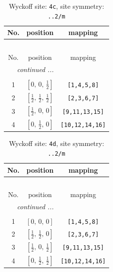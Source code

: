 \documentclass[fleqn,8pt]{jsarticle}
\begin{document}
\renewcommand{\arraystretch}{1.2}
\begin{longtable}{ccc}
\caption{Wyckoff site: {\tt 4c}, site symmetry: {\tt ..2/m}}
 \\
 \hline \hline
No. & position & mapping \\ \hline \endfirsthead

\multicolumn{2}{l}{\tablename\ \thetable{}} \\
 \hline \hline
No. & position & mapping \\ \hline \endhead

 \hline \hline
\multicolumn{2}{r}{\footnotesize\it continued ...} \\ \endfoot

 \hline \hline
\multicolumn{2}{r}{} \\ \endlastfoot

1 & $\left[ 0,\, 0,\, \frac{1}{2} \right]$ & {\tt [1,4,5,8]} \\ \hline
2 & $\left[ \frac{1}{2},\, \frac{1}{2},\, \frac{1}{2} \right]$ & {\tt [2,3,6,7]} \\ \hline
3 & $\left[ \frac{1}{2},\, 0,\, 0 \right]$ & {\tt [9,11,13,15]} \\ \hline
4 & $\left[ 0,\, \frac{1}{2},\, 0 \right]$ & {\tt [10,12,14,16]} \\
\end{longtable}
\renewcommand{\arraystretch}{1.2}
\begin{longtable}{ccc}
\caption{Wyckoff site: {\tt 4d}, site symmetry: {\tt ..2/m}}
 \\
 \hline \hline
No. & position & mapping \\ \hline \endfirsthead

\multicolumn{2}{l}{\tablename\ \thetable{}} \\
 \hline \hline
No. & position & mapping \\ \hline \endhead

 \hline \hline
\multicolumn{2}{r}{\footnotesize\it continued ...} \\ \endfoot

 \hline \hline
\multicolumn{2}{r}{} \\ \endlastfoot

1 & $\left[ 0,\, 0,\, 0 \right]$ & {\tt [1,4,5,8]} \\ \hline
2 & $\left[ \frac{1}{2},\, \frac{1}{2},\, 0 \right]$ & {\tt [2,3,6,7]} \\ \hline
3 & $\left[ \frac{1}{2},\, 0,\, \frac{1}{2} \right]$ & {\tt [9,11,13,15]} \\ \hline
4 & $\left[ 0,\, \frac{1}{2},\, \frac{1}{2} \right]$ & {\tt [10,12,14,16]} \\
\end{longtable}
\end{document}
